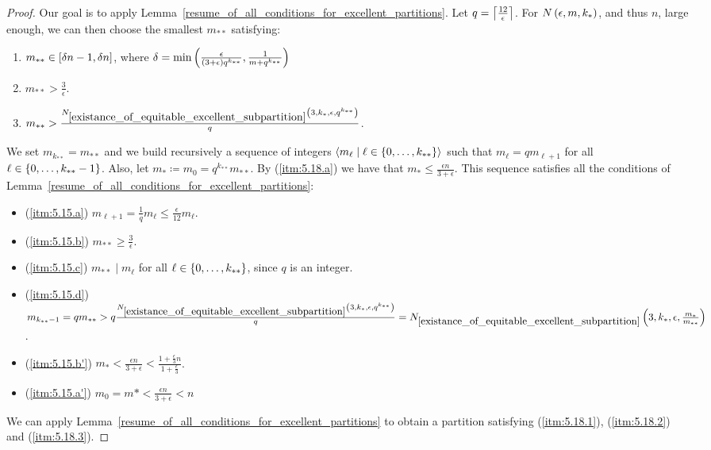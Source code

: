         \begin{proof}
            Our goal is to apply Lemma~\ref{resume_of_all_conditions_for_excellent_partitions}.
            Let $q = \left\lceil \frac{12}{\epsilon} \right\rceil$.
            For $N\left( \epsilon, m, k_* \right)$, and thus $n$, large enough, we can then choose the smallest $m_{**}$ satisfying:
            \begin{enumerate}[label=(\alph*), ref=\alph*]
                \item \label{itm:5.18.a} $m_{**} \in \left[ \delta n -1, \delta n \right]$, where
                    $\delta = \min \left( \frac{\epsilon}{\left( 3 + \epsilon \right) q^{k_{**}}}, \frac{1}{m + q^{k_{**}}} \right)$
                \item \label{itm:5.18.b} $m_{**} > \frac{3}{\epsilon}$.
                \item \label{itm:5.18.c} $m_{**} > \frac{N_{\ref{existance_of_equitable_excellent_subpartition}}
                    \left( 3, k_*, \epsilon, q^{k_{**}} \right)}{q}$.
            \end{enumerate}
            We set $m_{k_{**}} = m_{**}$ and we build recursively a sequence of integers
            $\left< m_\ell \mid \ell \in \left\{ 0, \dots, k_{**} \right\} \right>$ such that $m_\ell = q m_{\ell + 1}$ for all
            $\ell \in \left\{ 0, \dots, k_{**}-1 \right\}$.
            Also, let $m_* \coloneqq m_0 = q^{k_{**}} m_{**}$.
            By (\ref{itm:5.18.a}) we have that $m_* \leq \frac{\epsilon n}{3 + \epsilon}$.
            This sequence satisfies all the conditions of Lemma~\ref{resume_of_all_conditions_for_excellent_partitions}:
            \begin{itemize}[label={}]
                \item (\ref{itm:5.15.a}) $m_{\ell+1} = \frac{1}{q} m_\ell \leq \frac{\epsilon}{12} m_\ell$.
                \item (\ref{itm:5.15.b}) $m_{**} \geq \frac{3}{\epsilon}$.
                \item (\ref{itm:5.15.c}) $m_{**} \mid m_\ell$ for all $\ell \in \left\{ 0, \dots, k_{**} \right\}$, since $q$ is an integer.
                \item (\ref{itm:5.15.d}) $m_{k_{**}-1} = q m_{**} >
                    q \frac{N_{\ref{existance_of_equitable_excellent_subpartition}}\left( 3, k_*, \epsilon, q^{k_{**}} \right)}{q} =
                    N_{\ref{existance_of_equitable_excellent_subpartition}}\left( 3, k_*, \epsilon, \frac{m_*}{m_{**}} \right)$.
                \item (\ref{itm:5.15.b'}) $m_* < \frac{\epsilon n}{3 + \epsilon} < \frac{1 + \frac{\epsilon}{3}n}{1 + \frac{\epsilon}{3}}$.
                \item (\ref{itm:5.15.a'}) $m_0 = m* < \frac{\epsilon n}{3 + \epsilon} < n$
            \end{itemize}
            We can apply Lemma~\ref{resume_of_all_conditions_for_excellent_partitions} to obtain a partition
            satisfying (\ref{itm:5.18.1}), (\ref{itm:5.18.2}) and (\ref{itm:5.18.3}).


\end{proof}
